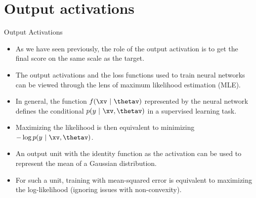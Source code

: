 
\section{Output activations}

\begin{frame} {Output Activations}
  \begin{itemize}
    \item As we have seen previously, the role of the output activation is to get the final score on the same scale as the target.
    \item The output activations and the loss functions used to train neural networks can be viewed through the lens of maximum likelihood estimation (MLE).
    \item In general, the function $f(\xv~|~\thetav)$ represented by the neural network defines the conditional $p(y~|~\xv,\thetav)$ in a supervised learning task.
    \item Maximizing the likelihood is then equivalent to minimizing $- \log p(y~|~\xv,\thetav)$.
    \item An output unit with the identity function as the activation can be used to represent the mean of a Gaussian distribution.
    \item For such a unit, training with mean-squared error is equivalent to maximizing the log-likelihood (ignoring issues with non-convexity).
  \end{itemize}
\end{frame}


